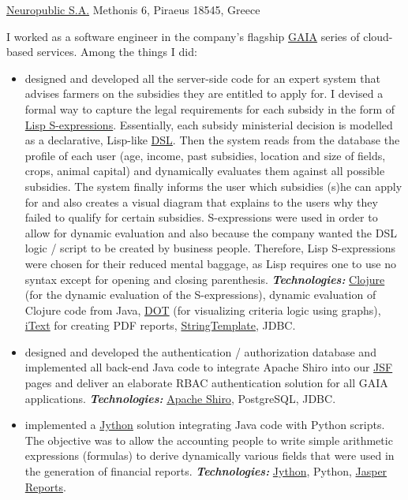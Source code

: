 \documentclass[helvetica,english,logo,notitle,totpages,utf8]{europecv2013}
\newcommand{\technologies}[0]{\textbf{\textit{Technologies:}}}
\begin{document}
\begin{europecv}
                   {\href{http://www.neuropublic.com}{Neuropublic S.A.}}
                   {Methonis 6, Piraeus 18545, Greece}
                   {
    I worked as a software engineer in the company's flagship \href{https://www.neuropublic.gr/en/component/k2/gaia-epicheirein}{GAIA} series of cloud-based services.
    Among the things I did:
    \begin{itemize}
    \item designed and developed all the server-side code for an expert system that advises farmers
      on the subsidies they are entitled to apply for. I devised a formal way to capture the legal requirements
      for each subsidy in the form of \href{https://en.wikipedia.org/wiki/S-expression}{Lisp S-expressions}.
      Essentially, each subsidy ministerial decision is
      modelled as a declarative, Lisp-like \href{https://en.wikipedia.org/wiki/Domain-specific_language}{DSL}.
      Then the system reads from the database the profile of each user (age, income, past subsidies, location
      and size of fields, crops, animal capital) and dynamically evaluates them against all possible subsidies.
      The system finally informs the user which subsidies (s)he can apply for and also creates
      a visual diagram that explains to the users why they failed to qualify for certain subsidies.
      S-expressions were used in order to allow for dynamic evaluation and also because the company wanted
      the DSL logic / script to be created by business people. Therefore, Lisp S-expressions were chosen
      for their reduced mental baggage, as Lisp requires one to use no syntax except for opening and closing parenthesis.
      \technologies{} \href{https://clojure.org/}{Clojure} (for
      the dynamic evaluation of the S-expressions), dynamic evaluation of Clojure code from Java,
      \href{https://en.wikipedia.org/wiki/DOT_(graph_description_language)}{DOT} (for visualizing
      criteria logic using graphs), \href{https://en.wikipedia.org/wiki/IText}{iText} for creating
      PDF reports, \href{http://www.stringtemplate.org/}{StringTemplate}, JDBC.
    \item designed and developed the authentication / authorization database and implemented all back-end Java
      code to integrate Apache Shiro into our \href{http://www.javaserverfaces.org/}{JSF} pages and deliver an elaborate RBAC authentication solution
      for all GAIA applications.
      \technologies{} \href{http://shiro.apache.org/}{Apache Shiro}, PostgreSQL, JDBC.
    \item implemented a \href{http://www.jython.org/}{Jython} solution integrating Java code with
      Python scripts. The objective was to
      allow the accounting people to write simple arithmetic expressions (formulas) to derive dynamically
      various fields that were used in the generation of financial reports.
      \technologies{} \href{http://www.jython.org/}{Jython}, Python, \href{http://community.jaspersoft.com/project/jasperreports-library}{Jasper Reports}.
    \end{itemize}
                   }



\end{europecv}
\end{document}

